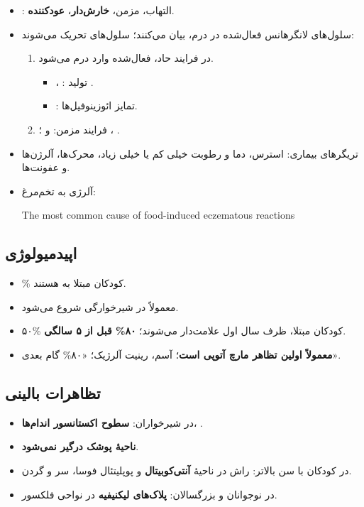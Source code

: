 \documentclass[12pt,a4paper]{article}
\begin{document}
\begin{itemize}
\item {}: التهاب، مزمن، \textbf{خارش‌دار}، \textbf{عودکننده}.
\item سلول‌های لانگرهانس فعال‌شده در درم،  بیان می‌کنند؛ سلول‌های  تحریک می‌شوند:
\begin{enumerate}
\item در فرایند حاد،  فعال‌شده وارد درم می‌شود.
\begin{itemize}
\item {}، : تولید .
\item {}: تمایز ائوزینوفیل‌ها.
\end{itemize}
\item فرایند مزمن:  و ؛ ، .
\end{enumerate}
\item تریگرهای بیماری: استرس، دما و رطوبت خیلی کم یا خیلی زیاد، محرک‌ها، آلرژن‌ها و عفونت‌ها.
\item آلرژی به تخم‌مرغ:
\begin{latin}
The most common cause of food-induced eczematous reactions
\end{latin}
\end{itemize}

\subsection*{اپیدمیولوژی}
\begin{itemize}
\item {}\% کودکان مبتلا به  هستند.
\item معمولاً در شیرخوارگی شروع می‌شود.
\item ۵۰\% کودکان مبتلا، ظرف سال اول علامت‌دار می‌شوند؛ \textbf{۸۰\% قبل از ۵ سالگی}.
\item \textbf{ معمولاً اولین تظاهر مارچ آتوپی است}؛ آسم، رینیت آلرژیک؛ «۸۰\% گام بعدی».
\end{itemize}

\subsection*{تظاهرات بالینی}
\begin{itemize}
\item در شیرخواران: \textbf{سطوح اکستانسور اندام‌ها}، .
\item \textbf{ناحیهٔ پوشک درگیر نمی‌شود}.
\item در کودکان با سن بالاتر: راش در ناحیهٔ \textbf{آنتی‌کوبیتال} و پوپلیتئال فوسا، سر و گردن.
\item در نوجوانان و بزرگسالان: \textbf{پلاک‌های لیکنیفیه} در نواحی فلکسور.
\end{itemize}
\end{document}

